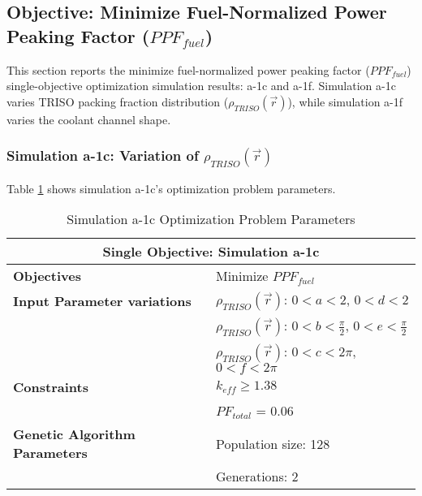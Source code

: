 \subsection{Objective: Minimize Fuel-Normalized Power Peaking Factor ($PPF_{fuel}$)}
\label{sec:assem-1-obj-ppf}
This section reports the minimize fuel-normalized power peaking factor 
($PPF_{fuel}$) single-objective optimization simulation results: a-1c and a-1f. 
Simulation a-1c varies \gls{TRISO} packing fraction distribution 
($\rho_{TRISO}(\vec{r})$), while simulation a-1f varies the coolant channel shape.

\subsubsection{Simulation a-1c: Variation of $\rho_{TRISO}(\vec{r})$}
Table \ref{tab:simulationa1c} shows simulation a-1c's optimization problem parameters. 
\begin{table}[htbp!]
    \centering
    \onehalfspacing
    \caption{Simulation a-1c Optimization Problem Parameters}
	\label{tab:simulationa1c}
    \footnotesize
    \begin{tabular}{l|p{5.3cm}}
    \hline 
    \multicolumn{2}{c}{\textbf{Single Objective: Simulation a-1c}} \\
    \hline 
    \textbf{Objectives} & Minimize $PPF_{fuel}$ \\
    \hline 
    \textbf{Input Parameter variations}
    & $\rho_{TRISO}(\vec{r})$: $0<a<2$, $0<d<2$\\
    & $\rho_{TRISO}(\vec{r})$: $0<b<\frac{\pi}{2}$, $0<e<\frac{\pi}{2}$\\
    & $\rho_{TRISO}(\vec{r})$: $0<c<2\pi$, $0<f<2\pi$\\
    \hline
    \textbf{Constraints} & $k_{eff} \geq 1.38$\\ 
    & $PF_{total}$ = 0.06 \\
    \hline 
    \textbf{Genetic Algorithm Parameters} & Population size: 128 \\
    & Generations: 2 \\
    \hline
    \end{tabular}
\end{table}

